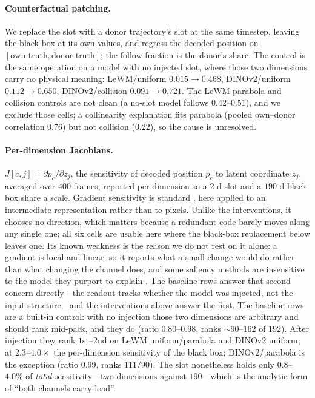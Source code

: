 \paragraph{Counterfactual patching.}
We replace the slot with a donor trajectory's slot at the same timestep, leaving the black box at its own values, and regress the decoded position on $[\text{own truth},\text{donor truth}]$; the follow-fraction is the donor's share. The control is the same operation on a model with no injected slot, where those two dimensions carry no physical meaning: LeWM/uniform $0.015\!\to\!0.468$, DINOv2/uniform $0.112\!\to\!0.650$, DINOv2/collision $0.091\!\to\!0.721$. The LeWM parabola and collision controls are not clean (a no-slot model follows $0.42$--$0.51$), and we exclude those cells; a collinearity explanation fits parabola (pooled own--donor correlation $0.76$) but not collision ($0.22$), so the cause is unresolved.

\paragraph{Per-dimension Jacobians.}
$J[c,j]=\partial p_c/\partial z_j$, the sensitivity of decoded position $p_c$ to latent coordinate $z_j$, averaged over $400$ frames, reported per dimension so a $2$-d slot and a $190$-d black box share a scale. Gradient sensitivity is standard \citep{simonyan2013saliency,sundararajan2017ig}, here applied to an intermediate representation rather than to pixels. Unlike the interventions, it chooses no direction, which matters because a redundant code barely moves along any single one; all six cells are usable here where the black-box replacement below leaves one. Its known weakness is the reason we do not rest on it alone: a gradient is local and linear, so it reports what a small change would do rather than what changing the channel does, and some saliency methods are insensitive to the model they purport to explain \citep{adebayo2018sanity}. The baseline rows answer that second concern directly---the readout tracks whether the model was injected, not the input structure---and the interventions above answer the first. The baseline rows are a built-in control: with no injection those two dimensions are arbitrary and should rank mid-pack, and they do (ratio $0.80$--$0.98$, ranks ${\sim}90$--$162$ of $192$). After injection they rank $1$st--$2$nd on LeWM uniform/parabola and DINOv2 uniform, at $2.3$--$4.0\times$ the per-dimension sensitivity of the black box; DINOv2/parabola is the exception (ratio $0.99$, ranks $111/90$). The slot nonetheless holds only $0.8$--$4.0\%$ of \emph{total} sensitivity---two dimensions against $190$---which is the analytic form of ``both channels carry load''.

